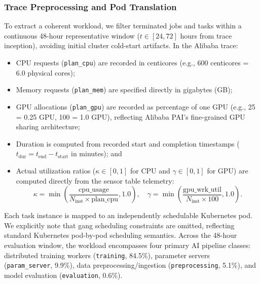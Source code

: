 \documentclass[a4paper,fleqn]{cas-dc}
\begin{document}
\subsubsection{Trace Preprocessing and Pod Translation}
To extract a coherent workload, we filter terminated jobs and tasks within a continuous 48-hour representative window ($t \in [24, 72]$ hours from trace inception), avoiding initial cluster cold-start artifacts. In the Alibaba trace:
\begin{itemize}
    \item CPU requests (\texttt{plan\_cpu}) are recorded in centicores (e.g., 600 centicores = 6.0 physical cores);
    \item Memory requests (\texttt{plan\_mem}) are specified directly in gigabytes (GB);
    \item GPU allocations (\texttt{plan\_gpu}) are recorded as percentage of one GPU (e.g., 25 = 0.25 GPU, 100 = 1.0 GPU), reflecting Alibaba PAI's fine-grained GPU sharing architecture;
    \item Duration is computed from recorded start and completion timestamps ($t_{\mathrm{dur}} = t_{\mathrm{end}} - t_{\mathrm{start}}$ in minutes); and
    \item Actual utilization ratios ($\kappa \in [0, 1]$ for CPU and $\gamma \in [0, 1]$ for GPU) are computed directly from the sensor table telemetry:
    \begin{equation}
    \kappa = \min\left(\frac{\text{cpu\_usage}}{N_{\mathrm{inst}} \times \text{plan\_cpu}}, 1.0\right), \quad
    \gamma = \min\left(\frac{\text{gpu\_wrk\_util}}{N_{\mathrm{inst}} \times 100}, 1.0\right).
    \end{equation}
\end{itemize}
Each task instance is mapped to an independently schedulable Kubernetes pod. We explicitly note that gang scheduling constraints are omitted, reflecting standard Kubernetes pod-by-pod scheduling semantics. Across the 48-hour evaluation window, the workload encompasses four primary AI pipeline classes: distributed training workers (\texttt{training}, 84.5\%), parameter servers (\texttt{param\_server}, 9.9\%), data preprocessing/ingestion (\texttt{preprocessing}, 5.1\%), and model evaluation (\texttt{evaluation}, 0.6\%).
\end{document}
